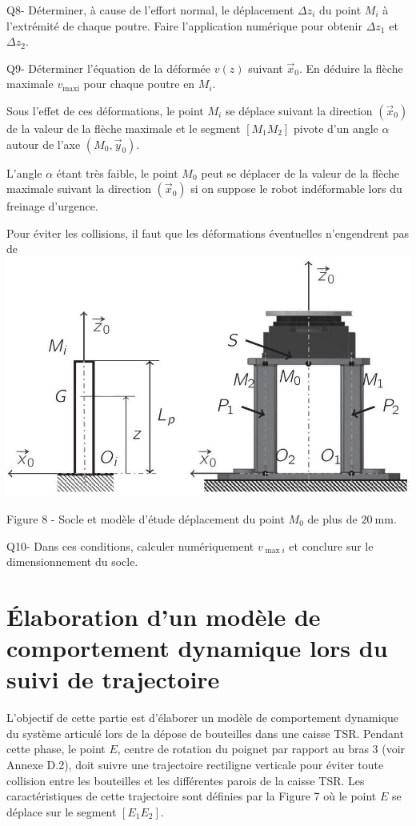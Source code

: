 \documentclass[10pt]{article}
\begin{document}
Q8- Déterminer, à cause de l'effort normal, le déplacement $\Delta z_{i}$ du point $M_{i}$ à l'extrémité de chaque poutre. Faire l'application numérique pour obtenir $\Delta z_{1}$ et $\Delta z_{2}$.

Q9- Déterminer l'équation de la déformée $v(z)$ suivant $\vec{x}_{0}$. En déduire la flèche maximale $v_{\operatorname{maxi}}$ pour chaque poutre en $M_{i}$.

Sous l'effet de ces déformations, le point $M_{i}$ se déplace suivant la direction $\left(\vec{x}_{0}\right)$ de la valeur de la flèche maximale et le segment $\left[M_{1} M_{2}\right]$ pivote d'un angle $\alpha$ autour de l'axe $\left(M_{0}, \vec{y}_{0}\right)$.

L'angle $\alpha$ étant très faible, le point $M_{0}$ peut se déplacer de la valeur de la flèche maximale suivant la direction $\left(\vec{x}_{0}\right)$ si on suppose le robot indéformable lors du freinage d'urgence.

Pour éviter les collisions, il faut que les déformations éventuelles n'engendrent pas de
\includegraphics[max width=\textwidth, center]{2023_11_27_dfbf12e0af72c49ac6a4g-09}

Figure 8 - Socle et modèle d'étude déplacement du point $M_{0}$ de plus de $20 \mathrm{~mm}$.

Q10- Dans ces conditions, calculer numériquement $v_{\max i}$ et conclure sur le dimensionnement du socle.

\section*{Élaboration d'un modèle de comportement dynamique lors du suivi de trajectoire}
L'objectif de cette partie est d'élaborer un modèle de comportement dynamique du système articulé lors de la dépose de bouteilles dans une caisse TSR. Pendant cette phase, le point $E$, centre de rotation du poignet par rapport au bras 3 (voir Annexe D.2), doit suivre une trajectoire rectiligne verticale pour éviter toute collision entre les bouteilles et les différentes parois de la caisse TSR. Les caractéristiques de cette trajectoire sont définies par la Figure 7 où le point $E$ se déplace sur le segment $\left[E_{1} E_{2}\right]$.
\end{document}
